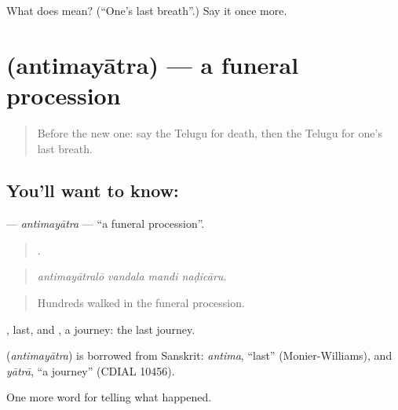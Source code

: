 \begin{tcolorbox}[breakable,colback=teal!4,colframe=teal!35!black,title={Before you move on}]
What does  mean? (\textquotedblleft{}One's last breath\textquotedblright{}.) Say it once more.
\end{tcolorbox}
\section[\texorpdfstring{\te{అంతిమయాత్ర} (antimayātra)}{అంతిమయాత్ర (antimayātra)}]{ (antimayātra) — a funeral procession}

\label{lesson:TE-C344-antimayatra}



\begin{quote}
Before the new one: say the Telugu for death, then the Telugu for one's last breath.
\end{quote}

\subsection*{You'll want to know: }
\textbf{} — \emph{antimayātra} — \textquotedblleft{}a funeral procession\textquotedblright{}.

\begin{quote}
   .
\end{quote}

\begin{quote}
\emph{antimayātralō vandala mandi naḍicāru.}
\end{quote}

\begin{quote}
Hundreds walked in the funeral procession.
\end{quote}

, last, and , a journey: the last journey.

\begin{cousinweb}
\textbf{} (\emph{antimayātra}) is borrowed from Sanskrit: \emph{antima}, \textquotedblleft{}last\textquotedblright{} (Monier-Williams), and \emph{yātrā}, \textquotedblleft{}a journey\textquotedblright{} (CDIAL 10456).
\end{cousinweb}

\begin{grammarlens}[title={What you've built}]
One more word for telling what happened.
\end{grammarlens}

